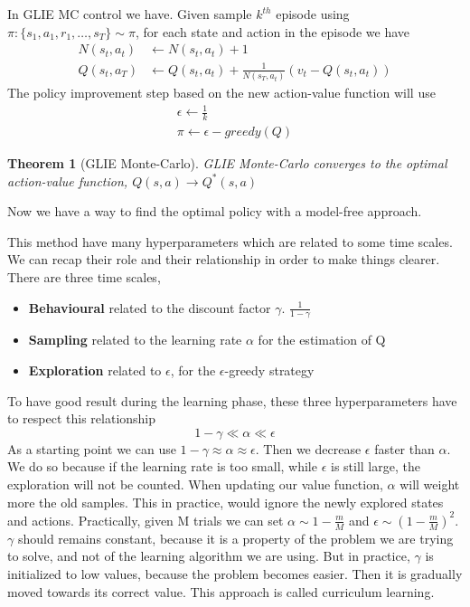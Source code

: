 \documentclass[main.tex]{subfiles}
\newtheorem{theorem}{Theorem}[section]
\begin{document}
\par\noindent
In GLIE MC control we have. Given sample $k^{th}$ episode using $\pi:\{ s_1,a_1,r_1,\dots,s_T \} \sim \pi$, for each state and action in the episode we have
\begin{align*}
    N(s_t,a_t)  & \leftarrow N(s_t,a_t) + 1                                      \\
    Q(s_t, a_T) & \leftarrow Q(s_t,a_t) + \frac{1}{N(s_T,a_t)}(v_t - Q(s_t,a_t))
\end{align*}
The policy improvement step based on the new action-value function will use
\begin{gather*}
    \epsilon \leftarrow \frac{1}{k} \\
    \pi \leftarrow \epsilon-greedy(Q)
\end{gather*}
\begin{theorem}[GLIE Monte-Carlo]
    GLIE Monte-Carlo converges to the optimal action-value function, $Q(s,a) \rightarrow Q^*(s,a)$
\end{theorem}
Now we have a way to find the optimal policy with a model-free approach.
\par\noindent
This method have many hyperparameters which are related to some time scales. We can recap their role and their relationship in order to make things clearer. There are three time scales,
\begin{itemize}
    \item \textbf{Behavioural} related to the discount factor $\gamma$. $\frac{1}{1-\gamma}$
    \item \textbf{Sampling} related to the learning rate $\alpha$ for the estimation of Q
    \item \textbf{Exploration} related to $\epsilon$, for the $\epsilon$-greedy strategy
\end{itemize}
To have good result during the learning phase, these three hyperparameters have to respect this relationship
\begin{equation*}
    1-\gamma \ll \alpha \ll \epsilon
\end{equation*}
As a starting point we can use $1-\gamma \approx \alpha \approx \epsilon$. Then we decrease $\epsilon$ faster than $\alpha$. We do so because if the learning rate is too small, while $\epsilon$ is still large, the exploration will not be counted. When updating our value function, $\alpha$ will weight more the old samples. This in practice, would ignore the newly explored states and actions.
Practically, given M trials we can set $\alpha \sim 1- \frac{m}{M}$ and $\epsilon \sim (1-\frac{m}{M})^2$. $\gamma$ should remains constant, because it is a property of the problem we are trying to solve, and not of the learning algorithm we are using. But in practice, $\gamma$ is initialized to low values, because the problem becomes easier. Then it is gradually moved towards its correct value. This approach is called curriculum learning.
\end{document}
